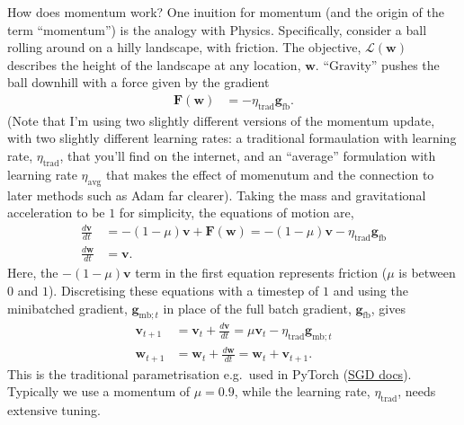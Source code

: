 \documentclass{article}
\newcommand{\dt}[2][]{\frac{d #1}{d #2}}
\newcommand{\0}{\mathbf{0}}
\newcommand{\g}{\mathbf{g}}
\newcommand{\mom}{\mathbf{v}}
\newcommand{\F}{\mathbf{F}}
\newcommand{\gfb}{\g_\text{fb}}
\newcommand{\gmbt}{\g_{\text{mb}; t}}
\newcommand{\w}{\mathbf{w}}
\renewcommand{\L}{\mathcal{L}}
\newcommand{\lrtrad}{\eta_\text{trad}}
\newcommand{\lravg}{\eta_\text{avg}}
\begin{document}
How does momentum work?
One inuition for momentum (and the origin of the term ``momentum'') is the analogy with Physics.
Specifically, consider a ball rolling around on a hilly landscape, with friction. 
The objective, $\L(\w)$ describes the height of the landscape at any location, $\w$.
``Gravity'' pushes the ball downhill with a force given by the gradient
\begin{align}
  \F(\w) &= - \lrtrad \gfb.
\end{align}
(Note that I'm using two slightly different versions of the momentum update, with two slightly different learning rates: a traditional formaulation with learning rate, $\lrtrad$, that you'll find on the internet, and an ``average'' formulation with learning rate $\lravg$ that makes the effect of momenutum and the connection to later methods such as Adam far clearer).
Taking the mass and gravitational acceleration to be $1$ for simplicity, the equations of motion are,
\begin{subequations}
\begin{align}
  \dt[\mom]{t} &= - (1-\mu) \mom + \F(\w) = - (1-\mu) \mom - \lrtrad \gfb\\
  \dt[\w]{t} &= \mom.
\end{align}
\end{subequations}
Here, the $- (1-\mu) \mom$ term in the first equation represents friction ($\mu$ is between $0$ and $1$).
Discretising these equations with a timestep of $1$ and using the minibatched gradient, $\gmbt$ in place of the full batch gradient, $\gfb$, gives
\begin{subequations}
\begin{align}
  \label{eq:sgdm:trad:mom}
  \mom_{t+1} &= \mom_t + \dt[\mom]{t} = \mu \mom_t - \lrtrad \gmbt\\
  \label{eq:sgdm:trad:w}
  \w_{t+1} &= \w_t + \dt[\w]{t} = \w_{t} + \mom_{t+1}.
\end{align}
\end{subequations}
This is the traditional parametrisation e.g.\ used in PyTorch (\href{https://pytorch.org/docs/stable/generated/torch.optim.SGD.html}{SGD docs}). Typically we use a momentum of $\mu=0.9$, while the learning rate, $\lrtrad$, needs extensive tuning.
\end{document}
